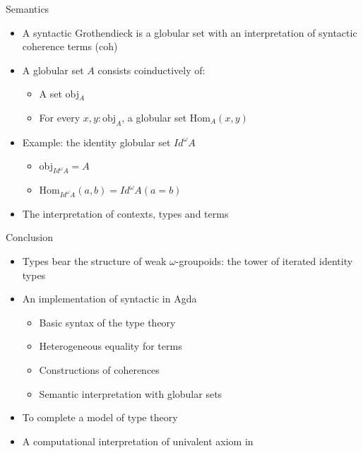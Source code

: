 \documentclass[12pt, mathserif,handout]{beamer}
\begin{document}
\begin{frame}{Semantics}

\begin{itemize}

\item A syntactic Grothendieck \wog is a globular set with an
  interpretation of syntactic coherence terms (coh)

\item A globular set $A$ consists coinductively of:
\begin{itemize}
\item A set obj$_{A}$
\item For every $x,y : \text{obj}_{A}$, a globular set Hom$_{A}(x, y)$
\end{itemize}

\item  Example: the identity globular set $Id^{\omega} A$
\begin{itemize}
\item obj$_{Id^{\omega} A} = A$
\item Hom$_{Id^{\omega} A}(a, b) = Id^{\omega} A (a = b)$
\end{itemize}

\item The interpretation of contexts, types and terms

\end{itemize}

\end{frame}











\begin{frame}{Conclusion}


\begin{itemize}

\item Types bear the structure of weak $\omega$-groupoids: the tower
  of iterated identity types

\item An implementation of syntactic \wog in Agda
  \begin{itemize}
  \item {Basic syntax of the type theory \tig}
  \item Heterogeneous equality for terms
  \item Constructions of coherences
  \item Semantic interpretation with globular sets
  \end{itemize}

\item To complete a \wogs model of type theory
\item A computational interpretation of univalent axiom in \itt

\end{itemize}




\end{frame}
\end{document}
